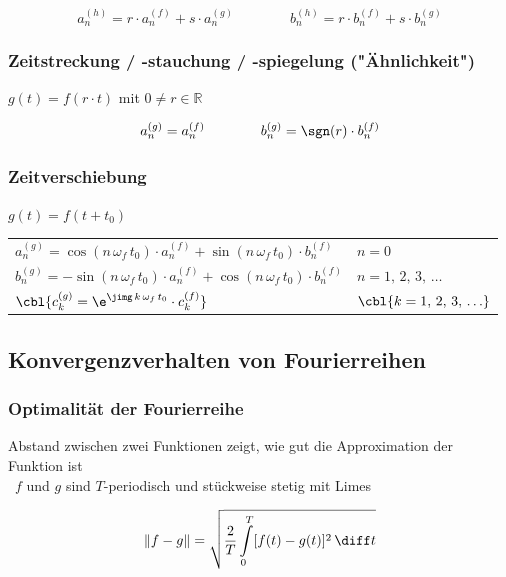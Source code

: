 $$ a_n^{(h)} = r \cdot a_n^{(f)} + s \cdot a_n^{(g)} \qquad \qquad b_n^{(h)} = r \cdot b_n^{(f)} + s \cdot b_n^{(g)} $$


\subsubsection{Zeitstreckung / -stauchung / -spiegelung ("Ähnlichkeit")}

$g(t) = f(r \cdot t)$ mit $0 \neq r \in \mathbb{R}$ \qquad {}

$$ a_n^{(g)} = a_n^{(f)} \qquad \qquad b_n^{(g)} = \sgn(r) \cdot b_n^{(f)} $$


\subsubsection{Zeitverschiebung}
$g(t) = f(t + t_0)$

\smallskip

\renewcommand{\arraystretch}{1.7}
\begin{tabular}{ll}
    $ a_n^{(g)} = \cos(n \, \omega_f \, t_0) \cdot a_n^{(f)} + \sin(n \, \omega_f \, t_0) \cdot b_n^{(f)}$      & $n = 0$ \quad [mit $b_0 = 0, \, 1, \, 2, \, \ldots$]  \\ 
    $ b_n^{(g)} = -\sin(n \, \omega_f \, t_0) \cdot a_n^{(f)} + \cos(n \, \omega_f \, t_0) \cdot  b_n^{(f)}$    & $n = 1, \, 2, \, 3, \, \ldots$                        \\	
    $ \cbl{c_k^{(g)} = \e^{\jimg \, k \, \omega_f \, t_0} \cdot c_k^{(f)}}$                                     & $\cbl{k  =1, \, 2, \, 3, \, \ldots}$
\end{tabular}
\renewcommand{\arraystretch}{1}


\subsection{Konvergenzverhalten von Fourierreihen}

\subsubsection{Optimalität der Fourierreihe}

Abstand zwischen zwei Funktionen zeigt, wie gut die Approximation der Funktion ist \\
\textrightarrow\ $f$ und $g$ sind $T$-periodisch und stückweise stetig mit Limes

$$ \Vert f - g \Vert = \sqrt{\frac{2}{T} \int \limits_0^T  [f(t) - g(t)]^2 \, \diff t } $$ 

